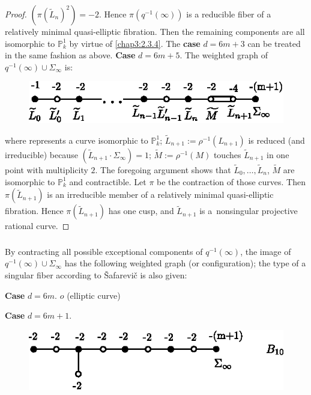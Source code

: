 \begin{proof}
$(\pi(\widetilde{L}_{n})^{2})=-2$. Hence $\pi(q^{-1}(\infty))$ is a
reducible fiber of a relatively minimal quasi-elliptic fibration. Then
the remaining components are all isomorphic to $\mathbb{P}^{1}_{k}$ by
virtue of \ref{chap3:2.3.4}. The {\bf case} $d=6m+3$ can be treated in the
same fashion as above. {\bf Case} $d=6m+5$. The weighted graph of
$q^{-1}(\infty)\cup\Sigma_{\infty}$ is:
\begin{figure}[H]
\centering
\includegraphics{figures/miyansi_fig16.eps}
\end{figure}
\noindent
where represents a curve isomorphic to $\mathbb{P}^{1}_{k}$;
$\widetilde{L}_{n+1}:=\rho^{-1}(L_{n+1})$ is reduced (and irreducible)
because $(\widetilde{L}_{n+1}\cdot\Sigma_{\infty})=1$;
$\widetilde{M}:=\rho^{-1}(M)$ touches $\widetilde{L}_{n+1}$ in one
point with multiplicity $2$. The foregoing argument shows that
$\widetilde{L}_{0},\ldots,\widetilde{L}_{n}$, $\widetilde{M}$ are
isomorphic to $\mathbb{P}^{1}_{k}$ and contractible. Let $\pi$ be the
contraction of those curves. Then $\pi(\widetilde{L}_{n+1})$ is an
irreducible member of a relatively minimal quasi-elliptic
fibration. Hence $\pi(\widetilde{L}_{n+1})$ has one cusp, and
$\widetilde{L}_{n+1}$ is a\pageoriginale\ nonsingular projective
rational curve.
\end{proof}

\subsubsection{}\label{chap3:2.7.5}
By contracting all possible exceptional components of
$q^{-1}(\infty)$, the image of $q^{-1}(\infty)\cup\Sigma_{\infty}$ has
the following weighted graph (or configuration); the type of a
singular fiber according to \v{S}afarevi\v{c} \cite{51} is also given:

\medskip
\noindent
{\bf Case} $d=6m$. \qquad $o$ (elliptic curve)

\medskip
\noindent
{\bf Case} $d=6m+1$.
\begin{figure}[H]
\centering
\includegraphics{figures/miyansi_fig17.eps}
\end{figure}


